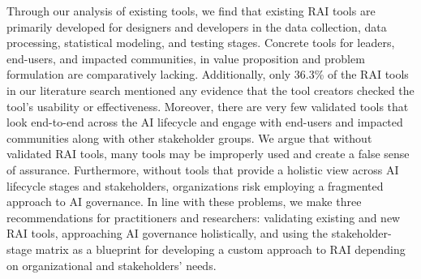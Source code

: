 Through our analysis of existing tools, we find that existing RAI tools are primarily developed for designers and developers in the data collection, data processing, statistical modeling, and testing stages.
Concrete tools for leaders, end-users, and impacted communities, in value proposition and problem formulation are comparatively lacking. 
Additionally, only 36.3\% of the RAI tools in our literature search mentioned any evidence that the tool creators checked the tool's usability or effectiveness.
Moreover, there are very few validated tools that look end-to-end across the AI lifecycle and engage with end-users and impacted communities along with other stakeholder groups.
We argue that without validated RAI tools, many tools may be improperly used and create a false sense of assurance. 
Furthermore, without tools that provide a holistic view across AI lifecycle stages and stakeholders, organizations risk employing a fragmented approach to AI governance. 
In line with these problems, we make three recommendations for practitioners and researchers: validating existing and new RAI tools, approaching AI governance holistically, and using the stakeholder-stage matrix as a blueprint for developing a custom approach to RAI depending on organizational and stakeholders' needs.

